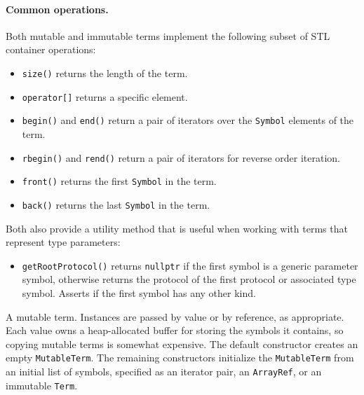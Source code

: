 \documentclass[../generics]{subfiles}
\begin{document}
\paragraph{Common operations.} Both mutable and immutable terms implement the following subset of STL container operations:
\begin{itemize}
\item \texttt{size()} returns the length of the term.
\item \texttt{operator[]} returns a specific element.
\item \texttt{begin()} and \texttt{end()} return a pair of iterators over the \texttt{Symbol} elements of the term.
\item \texttt{rbegin()} and \texttt{rend()} return a pair of iterators for reverse order iteration.
\item \texttt{front()} returns the first \texttt{Symbol} in the term.
\item \texttt{back()} returns the last \texttt{Symbol} in the term.
\end{itemize}
Both also provide a utility method that is useful when working with terms that represent type parameters:
\begin{itemize}
\item \texttt{getRootProtocol()} returns \texttt{nullptr} if the first symbol is a generic parameter symbol, otherwise returns the protocol of the first protocol or associated type symbol. Asserts if the first symbol has any other kind.
\end{itemize}

A mutable term. Instances are passed by value or by reference, as appropriate. Each value owns a heap-allocated buffer for storing the symbols it contains, so copying mutable terms is somewhat expensive. The default constructor creates an empty \texttt{MutableTerm}. The remaining constructors initialize the \texttt{MutableTerm} from an initial list of symbols, specified as an iterator pair, an \texttt{ArrayRef}, or an immutable \texttt{Term}.
\end{document}
